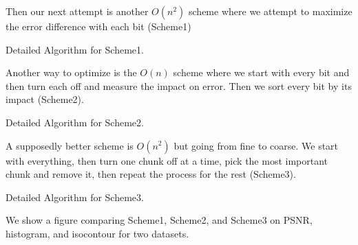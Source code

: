 Then our next attempt is another $O(n^2)$ scheme where we attempt to maximize the error difference with each bit (Scheme1)

Detailed Algorithm for Scheme1.

Another way to optimize is the $O(n)$ scheme where we start with every bit and then turn each off and measure the impact on error. Then we sort every bit by its impact (Scheme2).

Detailed Algorithm for Scheme2.

A supposedly better scheme is $O(n^2)$ but going from fine to coarse. We start with everything, then turn one chunk off at a time, pick the most important chunk and remove it, then repeat the process for the rest (Scheme3).

Detailed Algorithm for Scheme3.

We show a figure comparing Scheme1, Scheme2, and Scheme3 on PSNR, histogram, and isocontour for two datasets.
